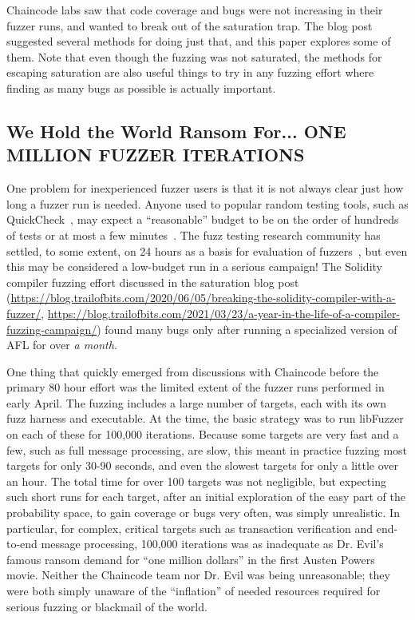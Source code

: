Chaincode labs saw that code coverage and bugs were not increasing in their fuzzer runs, and wanted to break out of the saturation trap.  The blog post suggested several methods for doing just that, and this paper explores some of them.  Note that even though the fuzzing was not saturated, the methods for escaping saturation are also useful things to try in any fuzzing effort where finding as many bugs as possible is actually important.

\subsection{We Hold the World Ransom For... ONE MILLION FUZZER ITERATIONS}

\begin{sloppypar}
  One problem for inexperienced fuzzer users is that it is not always clear just how long a fuzzer run is needed.  Anyone used to popular random testing tools, such as QuickCheck~\cite{ClaessenH00}, may expect a ``reasonable'' budget to be on the order of hundreds of tests or at most a few minutes~\cite{HolmesLOC}.  The fuzz testing research community has settled, to some extent, on 24 hours as a basis for evaluation of fuzzers~\cite{evalfuzz}, but even this may be considered a low-budget run in a serious campaign!  The Solidity compiler fuzzing effort discussed in the saturation blog post (\url{https://blog.trailofbits.com/2020/06/05/breaking-the-solidity-compiler-with-a-fuzzer/}, \url{https://blog.trailofbits.com/2021/03/23/a-year-in-the-life-of-a-compiler-fuzzing-campaign/}) found many bugs only after running a specialized version of AFL for over \emph{a month}.
  \end{sloppypar}

One thing that quickly emerged from discussions with Chaincode before the primary 80 hour effort was the limited extent of the fuzzer runs performed in early April.  The fuzzing includes a large number of targets, each with its own fuzz harness and executable.  At the time, the basic strategy was to run libFuzzer on each of these for 100,000 iterations.  Because some targets are very fast and a few, such as full message processing, are slow, this meant in practice fuzzing most targets for only 30-90 seconds, and even the slowest targets for only a little over an hour.  The total time for over 100 targets was not negligible, but expecting such short runs for each target, after an initial exploration of the easy part of the probability space, to gain coverage or bugs very often, was simply unrealistic.  In particular, for complex, critical targets such as transaction verification and end-to-end message processing, 100,000 iterations was as inadequate as Dr. Evil's famous ransom demand for ``one million dollars'' in the first Austen Powers movie.  Neither the Chaincode team nor Dr. Evil was being unreasonable; they were both simply unaware of the ``inflation'' of needed resources required for serious fuzzing or blackmail of the world.

